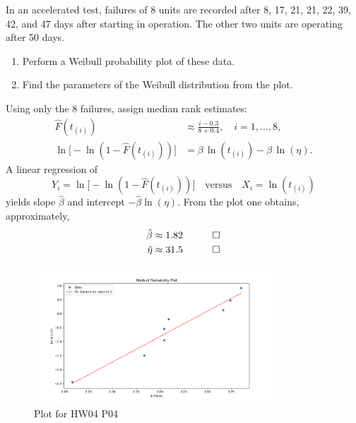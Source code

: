 \begin{hwkProblem}{4}{}

	In an accelerated test, failures of 8 units are recorded after 8, 17, 21, 21, 22, 39, 42, and 47 days after starting in operation. The other two units are operating after 50 days.
	\begin{enumerate}
		\item Perform a Weibull probability plot of these data.
		\item Find the parameters of the Weibull distribution from the plot.
	\end{enumerate}

	\hwkSol

	Using only the 8 failures, assign median rank estimates:
	\begin{align*}
		\hat{F}(t_{(i)}) &\approx \frac{i-0.3}{8+0.4},\quad i=1,\ldots,8,\\[1mm]
		\ln\bigl[-\ln(1-\hat{F}(t_{(i)}))\bigr] &= \beta\,\ln(t_{(i)}) - \beta\,\ln(\eta).
	\end{align*}
	A linear regression of
	\[
		Y_i=\ln\bigl[-\ln(1-\hat{F}(t_{(i)}))\bigr] \quad \text{versus} \quad X_i=\ln(t_{(i)})
	\]
	yields slope $\hat{\beta}$ and intercept $-\hat{\beta}\ln(\eta)$. From the plot one obtains, approximately,
	\begin{align*}
		\hat{\beta} &\approx 1.82 \quad \qed \\
		\hat{\eta} &\approx 31.5 \quad \qed
	\end{align*}

	\begin{figure}[H]
		\begin{center}
			\includegraphics[width=0.8\textwidth]{./images/s04.png}
		\end{center}
		\caption{Plot for HW04 P04}\label{fig:s04}
	\end{figure}

	\hwkCode

	

\end{hwkProblem}



